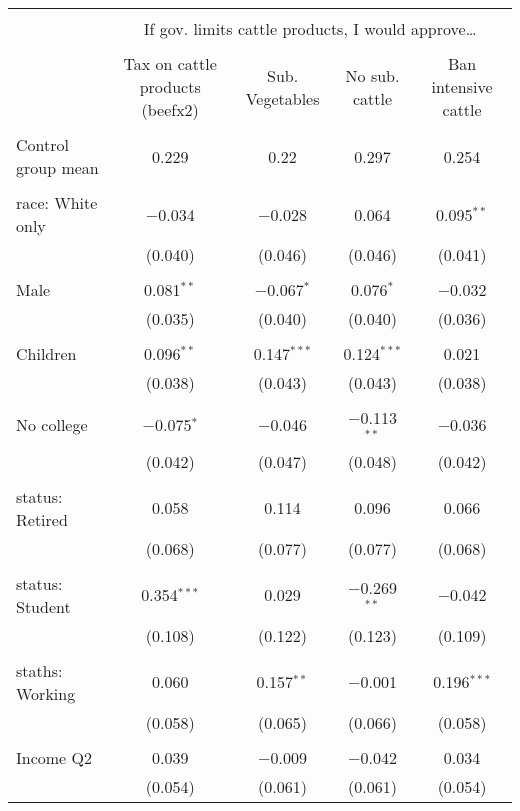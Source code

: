 
\begin{tabular}{@{\extracolsep{5pt}}lcccc} 
\\[-1.8ex]\hline 
\hline \\[-1.8ex] 
 & \multicolumn{4}{c}{If gov. limits cattle products, I would approve…} \\ 
\cline{2-5} 
\\[-1.8ex] & Tax on cattle products (beefx2) & Sub. Vegetables & No sub. cattle & Ban intensive cattle \\ 
\hline \\[-1.8ex] 
 Control group mean & 0.229 & 0.22 & 0.297 & 0.254  \\ \hline \\[-1.8ex] race: White only & $-$0.034 & $-$0.028 & 0.064 & 0.095$^{**}$ \\ 
  & (0.040) & (0.046) & (0.046) & (0.041) \\ 
  & & & & \\ 
 Male & 0.081$^{**}$ & $-$0.067$^{*}$ & 0.076$^{*}$ & $-$0.032 \\ 
  & (0.035) & (0.040) & (0.040) & (0.036) \\ 
  & & & & \\ 
 Children & 0.096$^{**}$ & 0.147$^{***}$ & 0.124$^{***}$ & 0.021 \\ 
  & (0.038) & (0.043) & (0.043) & (0.038) \\ 
  & & & & \\ 
 No college & $-$0.075$^{*}$ & $-$0.046 & $-$0.113$^{**}$ & $-$0.036 \\ 
  & (0.042) & (0.047) & (0.048) & (0.042) \\ 
  & & & & \\ 
 status: Retired & 0.058 & 0.114 & 0.096 & 0.066 \\ 
  & (0.068) & (0.077) & (0.077) & (0.068) \\ 
  & & & & \\ 
 status: Student & 0.354$^{***}$ & 0.029 & $-$0.269$^{**}$ & $-$0.042 \\ 
  & (0.108) & (0.122) & (0.123) & (0.109) \\ 
  & & & & \\ 
 staths: Working & 0.060 & 0.157$^{**}$ & $-$0.001 & 0.196$^{***}$ \\ 
  & (0.058) & (0.065) & (0.066) & (0.058) \\ 
  & & & & \\ 
 Income Q2 & 0.039 & $-$0.009 & $-$0.042 & 0.034 \\ 
  & (0.054) & (0.061) & (0.061) & (0.054) \\ 

\end{tabular}
